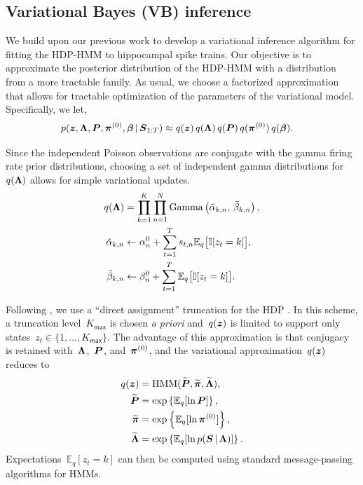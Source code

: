\subsection{Variational Bayes (VB) inference}



We build upon our previous work \citep{Chen12a,Chen14,Johnson14} to
develop a variational inference algorithm for fitting the HDP-HMM to
hippocampal spike trains. Our objective is to approximate the
posterior distribution of the HDP-HMM with a distribution from a more
tractable family. As usual, we choose a factorized approximation that
allows for tractable optimization of the parameters of the variational
model. Specifically, we let,
\begin{align*}
  p(\boldsymbol{z}, \boldsymbol{\Lambda}, \boldsymbol{P}, \boldsymbol{\pi}^{(0)}, \boldsymbol{\beta} \,|\, \boldsymbol{S}_{1:T}) 
  &\approx q(\boldsymbol{z}) \, q(\boldsymbol{\Lambda}) \, q(\boldsymbol{P}) \, q(\boldsymbol{\pi}^{(0)}) \, q(\boldsymbol{\beta}).
\end{align*}

Since the independent Poisson observations are conjugate with the
gamma firing rate prior distributions, choosing a set of independent
gamma distributions for~$q(\boldsymbol{\Lambda})$ allows for simple variational
updates.
\begin{align*}
  q(\boldsymbol{\Lambda}) &= \prod_{k=1}^K \prod_{n=1}^N \mathrm{Gamma}\left(\tilde{\alpha}_{k,n},\, \tilde{\beta}_{k,n} \right), \\
  \tilde{\alpha}_{k,n} &\leftarrow \alpha_n^{0} + \sum_{t=1}^T s_{t,n} \mathbb{E}_q\big[\mathbb{I}[z_t=k]\big], \\
  \tilde{\beta}_{k,n} &\leftarrow\beta_n^{0} + \sum_{t=1}^T \mathbb{E}_q\big[\mathbb{I}[z_t=k]\big].
\end{align*}

Following \citep{Johnson14}, we use a ``direct assignment'' truncation
for the HDP \citep{Bryant12, Liang07}. In this scheme, a truncation
level~$K_{\mathsf{max}}$ is chosen {\it a priori} and~$q(\boldsymbol{z})$ is limited to
support only states~${z_t\in\{1,\ldots, K_{\mathsf{max}}\}}$. The advantage of this
approximation is that conjugacy is retained with~$\boldsymbol{\Lambda}$,~$\boldsymbol{P}$,
and~$\boldsymbol{\pi}^{(0)}$, and the variational approximation~$q(\boldsymbol{z})$ reduces
to
\begin{align*}
q(\boldsymbol{z}) &= \mathrm{HMM}(\widetilde{\boldsymbol{P}}, \widetilde{\boldsymbol{\pi}}, \widetilde{\boldsymbol{\Lambda}}), \\
\widetilde{\boldsymbol{P}} &= \exp\left\{\mathbb{E}_q[\ln \boldsymbol{P}]\right\}, \\
\widetilde{\boldsymbol{\pi}} &= \exp\left\{\mathbb{E}_q[\ln \boldsymbol{\pi}^{(0)}]\right\}, \\
\widetilde{\boldsymbol{\Lambda}} &= \exp\left\{\mathbb{E}_q[\ln p(\boldsymbol{S} \,|\, \boldsymbol{\Lambda})]\right\}.
\end{align*}
Expectations~${\mathbb{E}_q[z_t=k]}$ can then be computed using
standard message-passing algorithms for HMMs.

